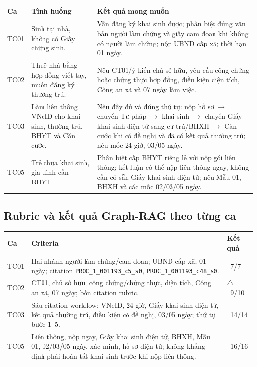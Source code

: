 \documentclass[11pt,a4paper]{article}
\newcommand{\yes}{\textcolor{green!50!black}{\checkmark}}
\newcommand{\partok}{\textcolor{orange!80!black}{\ensuremath{\triangle}}}
\newcommand{\src}[1]{\texttt{#1}}
\begin{document}
\begin{longtable}{p{1.1cm}p{4.2cm}p{8.1cm}}
\toprule
\textbf{Ca} & \textbf{Tình huống} & \textbf{Kết quả mong muốn}\\
\midrule
\endhead
TC01 & Sinh tại nhà, không có Giấy chứng sinh. & Vẫn đăng ký khai sinh được; phân biệt đúng văn bản người làm chứng và giấy cam đoan khi không có người làm chứng; nộp UBND cấp xã; thời hạn 01 ngày.\\
TC02 & Thuê nhà bằng hợp đồng viết tay, muốn đăng ký thường trú. & Nêu CT01/ý kiến chủ sở hữu, yêu cầu công chứng hoặc chứng thực hợp đồng, điều kiện diện tích, Công an xã và 07 ngày làm việc.\\
TC03 & Làm liên thông VNeID cho khai sinh, thường trú, BHYT và Căn cước. & Nêu đầy đủ và đúng thứ tự: nộp hồ sơ $\rightarrow$ chuyển Tư pháp $\rightarrow$ khai sinh $\rightarrow$ chuyển Giấy khai sinh điện tử sang cư trú/BHXH $\rightarrow$ Căn cước khi có đề nghị và đã có kết quả thường trú; nêu mốc 24 giờ, 03/05 ngày.\\
TC05 & Trẻ chưa khai sinh, gia đình cần BHYT. & Phân biệt cấp BHYT riêng lẻ với nộp gói liên thông; kết luận có thể nộp liên thông ngay, không cần có sẵn Giấy khai sinh điện tử; nêu Mẫu 01, BHXH và các mốc 02/03/05 ngày.\\
\bottomrule
\end{longtable}

\subsection{Rubric và kết quả Graph-RAG theo từng ca}
\begin{longtable}{p{1.1cm}p{9.8cm}p{2.2cm}}
\toprule
\textbf{Ca} & \textbf{Criteria} & \textbf{Kết quả}\\
\midrule
\endhead
TC01 & Hai nhánh người làm chứng/cam đoan; UBND cấp xã; 01 ngày; citation \src{PROC\_1\_001193\_c5\_s0}, \src{PROC\_1\_001193\_c48\_s0}. & \yes\ 7/7\\
TC02 & CT01, chủ sở hữu, công chứng/chứng thực, diện tích, Công an xã, 07 ngày; bốn citation rubric. & \partok\ 9/10\\
TC03 & Sáu citation workflow; VNeID, 24 giờ, Giấy khai sinh điện tử, kết quả thường trú, điều kiện có đề nghị, 03/05 ngày; thứ tự bước 1--5. & \yes\ 14/14\\
TC05 & Liên thông, nộp ngay, Giấy khai sinh điện tử, BHXH, Mẫu 01, 02/03/05 ngày, xác minh, hồ sơ điện tử; không khẳng định phải hoàn tất khai sinh trước khi nộp liên thông. & \yes\ 16/16\\
\bottomrule
\end{longtable}
\end{document}
